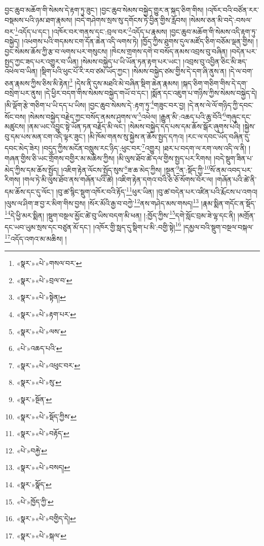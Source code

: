 བྱང་ཆུབ་མཆོག་གི་སེམས་དེ་རྟག་ཏུ་ཟུང་། །བྱང་ཆུབ་སེམས་བསྐྱེད་གྱུར་ན་སྐད་ཅིག་གིས། །འཁོར་བའི་བཙོན་རར་བསྡམས་པའི་ཉམ་ཐག་རྣམས། །བདེ་གཤེགས་སྲས་སུ་དགོངས་ཏེ་བྱིན་གྱིས་རློབས། །སེམས་ཅན་མི་བདེ་:བསལ་བར་\footnote{«སྣར་»«པེ་»གསལ་བར་}འདོད་པ་དང་། །འཁོར་བར་གནས་དང་:བྲལ་བར་\footnote{«སྣར་»«པེ་»བྲལ་བ་}འདོད་པ་རྣམས། །བྱང་ཆུབ་མཆོག་གི་སེམས་འདི་རྟག་ཏུ་བསྐྱེད། །འཕགས་པའི་གདམས་ངག་དོན་ཆེན་འདི་ལགས་ཏེ། །ཁྱོད་ཀྱིས་ཐུགས་དུལ་མཛོད་ཅིག་བཅོམ་ལྡན་གྱིས། །བྱང་སེམས་ཆོས་ཀྱི་རྩ་བ་ལགས་པར་གསུངས། །ཁེངས་གྲགས་དགེ་བ་བསོད་ནམས་འབྲས་བུ་བཞིན། །བདེན་པར་སྤྱད་ཀྱང་ཟད་པར་འགྱུར་བ་ཡིན། །སེམས་བསྐྱེད་པ་ཡི་ཡོན་ཏན་རྟག་པར་ཡང་། །འབྲས་བུ་འབྱིན་ཅིང་མི་ཟད་འཕེལ་བ་ཡིན། །སྡིག་པའི་ཕུང་པོ་རི་རབ་ཙམ་ཡོད་ཀྱང་། །སེམས་བསྐྱེད་ཙམ་གྱིས་དེ་དག་ཞི་ནུས་ན། །དེ་ལ་བག་ཅན་རྣམས་ཀྱིས་ཅིས་མི་རྟེན།\footnote{«སྣར་»«པེ་»སྟེན།} །དེས་ནི་དུས་མཐའི་མེ་བཞིན་སྡིག་ཆེན་རྣམས། །སྐད་ཅིག་གཅིག་གིས་དེ་དག་བསྲེག་པར་ནུས། །དེ་ཕྱིར་བདག་གིས་སེམས་བསྐྱེད་གཡོ་བ་དང་། །སྨོན་དང་འཇུག་པ་གཉིས་ཀྱིས་སེམས་བསྐྱེད་དེ། །མི་ལྡོག་རྩེ་གཅིག་པ་ཡི་དད་པ་ཡིས། །བྱང་ཆུབ་སེམས་དེ་:རྟག་ཏུ་\footnote{«སྣར་»«པེ་»རྟག་པར་}གཟུང་བར་བྱ། །དེ་ནས་ལེ་ལོ་གཉིད་ཀྱི་དབང་སོང་བས། །སེམས་བསྐྱེད་བརྗེད་ཀྱང་བསོད་ནམས་ཤུགས་ལ་\footnote{«སྣར་»«པེ་»ལས་}འཕེལ། །རྒྱུན་མི་:འཆད་པའི་ཆུ་བོའི་\footnote{«པེ་»འཆད་པའི་}གཞུང་དང་མཚུངས། །ནམ་ཡང་འབྱུང་སྟེ་ཡོན་ཏན་བརྗོད་མི་ལང་། །སེམས་བསྐྱེད་དད་པས་དམ་ཆོས་སྒོར་ཞུགས་པའི། །སྐྱེས་བུ་དམ་པས་མན་ངག་འདི་ལྟར་ཟུང་། །མི་ཁོམ་གནས་སུ་སྐྱེས་ན་ཆོས་སྤྱད་དཀའ། །རང་ལ་དབང་ཡོད་བཞིན་དུ་དབང་མེད་ཟེར། །བདུད་ཀྱིས་མངོན་བསླུས་རང་ཉིད་:ཕུང་བར་\footnote{«སྣར་»«པེ་»འཕུང་བར་}འགྱུར། །ཐར་པ་བདག་ལ་རག་ལས་འདི་ལ་ནི། །གཞན་གྱིས་ཅི་ཡང་གྲོགས་བགྱིར་མ་མཆིས་ཀྱིས། །མི་ལུས་ཐོབ་ཚེ་དལ་གྱིས་སྤྱད་པར་རིགས། །བདེ་སྡུག་ཟིན་པ་མེད་ཀྱིས་དམ་ཆོས་སྤྱོད། །འཇིག་རྟེན་ལོངས་སྤྱོད་སུས་\footnote{«སྣར་»«པེ་»སུ་}ཟ་ཆ་མེད་ཀྱིས། །སྔུན་\footnote{«སྣར་»སྔོན་}ན་:སྡོད་ཀྱི་\footnote{«སྣར་»«པེ་»སྡོད་ཀྱིས་}སོ་ནམ་འབད་པར་རིགས། །གལ་ཏེ་མི་ལུས་ཐོབ་ནས་གཞོན་པའི་ཚེ། །འཇིག་རྟེན་དགའ་བའི་ཅ་ཅོ་སོགས་བོར་ལ། །གཞོན་པའི་ཚེ་ནི་དམ་ཆོས་དང་དུ་ལོང་། །བུ་ཚ་སྙིང་སྡུག་འཁོར་བའི་རྟོད་\footnote{«སྣར་»«པེ་»བརྟོད་}ཕུར་ཡིན། །བུ་ཚ་བདེན་པར་འཛིན་པའི་རྨོངས་པ་འགའ། །ལུས་ལ་ཤིག་ཟ་བྱ་ར་མིག་གིས་བྱས། །སོར་མོའི་རྒྱ་བ་བཀྱེ་\footnote{«པེ་»བརྐྱེ་}ནས་གཤེད་མས་གསད།\footnote{«སྣར་»«པེ་»བསད།} །རྣམ་སྨིན་གདོང་ན་སྡོད་\footnote{«སྣར་»སྣོད་}དེ་ཕྱི་མར་སྨིན། །སྡུག་བསྔལ་མྱོང་ཚེ་བུ་ཡིས་བདག་མི་ཕན། །:ཁྱོད་ཀྱིས་\footnote{«པེ་»ཁྱོད་ཀྱི་}དགེ་སློང་བྲམ་ཟེ་ལྷ་དང་ནི། །མགྲོན་དང་ཡབ་ཡུམ་སྲས་དང་བཙུན་མོ་དང་། །འཁོར་གྱི་སླད་དུ་སྡིག་པ་མི་:བགྱི་སྟེ།\footnote{«སྣར་»«པེ་»བགྱིད་དེ།} །དམྱལ་བའི་སྡུག་བསྔལ་བསྐལ་\footnote{«སྣར་»«པེ་»སྐལ་}འདོད་འགའ་མ་མཆིས། །
